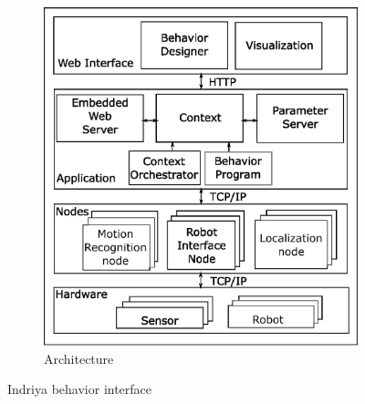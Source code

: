\documentclass{llncs}
\begin{document}
\begin{figure}
\begin{subfigure}[t]{0.48\textwidth}
\includegraphics[width=\textwidth]{../thesis/assets/architecture.eps}
\caption[System Architecture]{Architecture}
\end{subfigure}
\caption[System Architecture]{Indriya behavior interface}
\label{fig:architecture}
\end{figure}
\end{document}
